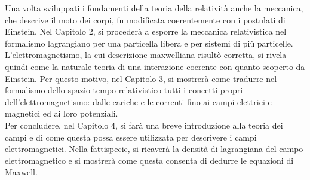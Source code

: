 Una volta sviluppati i fondamenti della teoria della relatività anche la meccanica, che descrive il moto dei corpi, fu modificata coerentemente con i postulati di Einstein. Nel Capitolo 2, si procederà a esporre la meccanica relativistica nel formalismo lagrangiano per una particella libera e per sistemi di più particelle.\\

L'elettromagnetismo, la cui descrizione maxwelliana risultò corretta, si rivela quindi come la naturale teoria di una interazione coerente con quanto scoperto da Einstein. Per questo motivo, nel Capitolo 3, si mostrerà come tradurre nel formalismo dello spazio-tempo relativistico tutti i concetti propri dell'elettromagnetismo: dalle cariche e le correnti fino ai campi elettrici e magnetici ed ai loro potenziali.\\

Per concludere, nel Capitolo 4, si farà una breve introduzione alla teoria dei campi e di come questa possa essere utilizzata per descrivere i campi elettromagnetici. Nella fattispecie, si ricaverà la densità di lagrangiana del campo elettromagnetico e si mostrerà come questa consenta di dedurre le equazioni di Maxwell.
